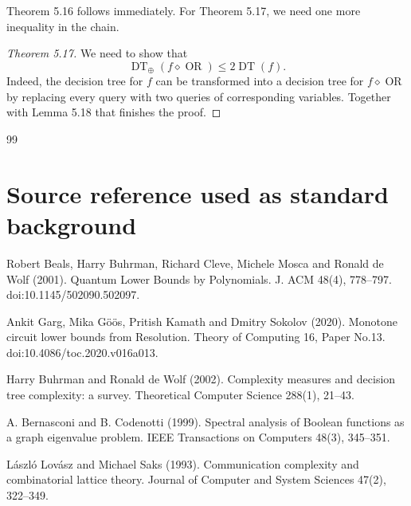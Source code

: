 \documentclass[10pt,a4paper]{article}
\newcommand{\DT}{\operatorname{DT}}
\newcommand{\comp}{\diamond}
\newcommand{\OR}{\operatorname{OR}}
\begin{document}
Theorem 5.16 follows immediately. For Theorem 5.17, we need one more inequality in the chain.
\begin{proof}[Theorem 5.17]
We need to show that
\[\DT_\oplus(f\comp\OR)\le2\DT(f).\]
Indeed, the decision tree for $f$ can be transformed into a decision tree for $f\comp\OR$ by replacing every query with two queries of corresponding variables. Together with Lemma 5.18 that finishes the proof.
\end{proof}

\begin{thebibliography}{99}
\section*{Source reference used as standard background}
Robert Beals, Harry Buhrman, Richard Cleve, Michele Mosca and Ronald de Wolf (2001). Quantum Lower Bounds by Polynomials. J. ACM 48(4), 778--797. doi:10.1145/502090.502097.

Ankit Garg, Mika G\"o\"os, Pritish Kamath and Dmitry Sokolov (2020). Monotone circuit lower bounds from Resolution. Theory of Computing 16, Paper No.13. doi:10.4086/toc.2020.v016a013.

Harry Buhrman and Ronald de Wolf (2002). Complexity measures and decision tree complexity: a survey. Theoretical Computer Science 288(1), 21--43.

A. Bernasconi and B. Codenotti (1999). Spectral analysis of Boolean functions as a graph eigenvalue problem. IEEE Transactions on Computers 48(3), 345--351.

L\'aszl\'o Lov\'asz and Michael Saks (1993). Communication complexity and combinatorial lattice theory. Journal of Computer and System Sciences 47(2), 322--349.
\end{thebibliography}
\end{document}
